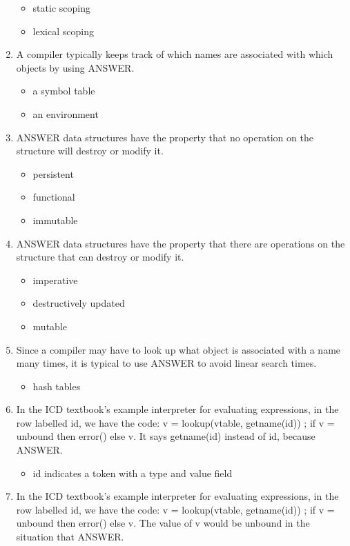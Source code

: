 \documentclass{exam}
\begin{document}
\begin{enumerate}
\begin{itemize}
\item static scoping
\item lexical scoping
\end{itemize}
\item A compiler typically keeps track of which names are associated with which objects by using ANSWER.
\begin{itemize}
\item a symbol table
\item an environment
\end{itemize}
\item ANSWER data structures have the property that no operation on the structure will destroy or modify it.
\begin{itemize}
\item persistent
\item functional
\item immutable
\end{itemize}
\item ANSWER data structures have the property that there are operations on the structure that can destroy or modify it.
\begin{itemize}
\item imperative
\item destructively updated
\item mutable
\end{itemize}
\item Since a compiler may have to look up what object is associated with a name many times, it is typical to use ANSWER to avoid linear search times.
\begin{itemize}
\item hash tables
\end{itemize}
\item In the ICD textbook's example interpreter for evaluating expressions, in the row labelled id, we have the code: v = lookup(vtable, getname(id)) ; if v = unbound then error() else v.  It says getname(id) instead of id, because ANSWER.
\begin{itemize}
\item id indicates a token with a type and value field
\end{itemize}
\item In the ICD textbook's example interpreter for evaluating expressions, in the row labelled id, we have the code: v = lookup(vtable, getname(id)) ; if v = unbound then error() else v.  The value of v would be unbound in the situation that ANSWER.
\begin{itemize}

\end{itemize}
\end{enumerate}
\end{document}
